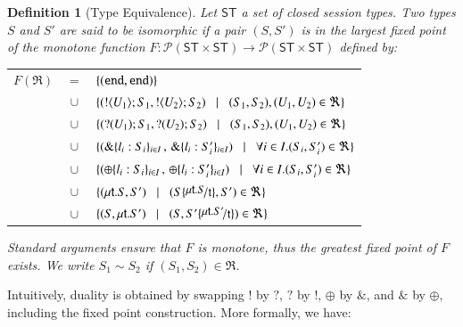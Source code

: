 \documentclass[preprint,11pt]{elsarticle}
\newtheorem{definition}{Definition}[section]
\begin{document}
\begin{definition}[Type Equivalence]
\label{def:iso}
Let $\mathsf{ST}$ a set of closed session types. 
Two types $S$ and $S'$ are said to be {\em isomorphic} if a pair $(S,S')$ is 
in the largest fixed point of the monotone function
$F:\mathcal{P}(\mathsf{ST}\times \mathsf{ST}) \to 
\mathcal{P}(\mathsf{ST}\times \mathsf{ST})$ defined by:

\hspace{-0.5cm}\begin{tabular}{rcl}
$F(\Re)$ &$\!\!=\!\!$&	$\{(\mathtt{end}, \mathtt{end})\}$\\
         &$\!\!\cup\!\!$&	$\{(! \langle U_1 \rangle ; S_1, ! \langle U_2 \rangle ; S_2)
\;\;\;|\;\;\; (S_1, S_2),(U_1, U_2)\in \Re\}$\\ 
       &$\!\!\cup\!\!$&	$\{(? (U_1) ; S_1, ? (U_2) ; S_2)
\;\;\;|\;\;\;(S_1, S_2),(U_1, U_2)\in \Re\}$\\ 
	&$\!\!\cup\!\!$&	$\{(\& \{l_i: S_i\}_{i \in I} \,,\, \& \{l_i: S_i'\}_{i \in I}) \;\;\;|\;\;\; \forall i\in I. (S_i, S_i')\in \Re\}$\\
	&$\!\!\cup\!\!$&	$\{(\oplus \{l_i: S_i\}_{i \in I}\,,\, \oplus \{l_i: S_i'\}_{i \in I}) \;\;\;|\;\;\; \forall i\in I. (S_i, S_i')\in \Re\}$\\
	&$\!\!\cup\!\!$&	$\set{(\trec{t}{S}, S')
\bnfbar (S\subst{\trec{t}{S}}{\vart{t}},S')\in \Re}$\\
	&$\!\!\cup\!\!$&	$\set{(S,\trec{t}{S'})
\bnfbar (S,S'\subst{\trec{t}{S'}}{\vart{t}})\in \Re}$
\end{tabular}
	
\noindent
Standard arguments ensure that $F$ is monotone, thus the greatest fixed point
of $F$ exists. We write $S_1 \sim S_2$ if  $(S_1,S_2)\in \Re$. 
\end{definition}


Intuitively, duality is  obtained by 
swapping $!$ by $?$, $?$ by $!$, $\oplus$ by $\&$, and $\&$ by $\oplus$,  
including the fixed point construction.
More formally, we have:
\end{document}
